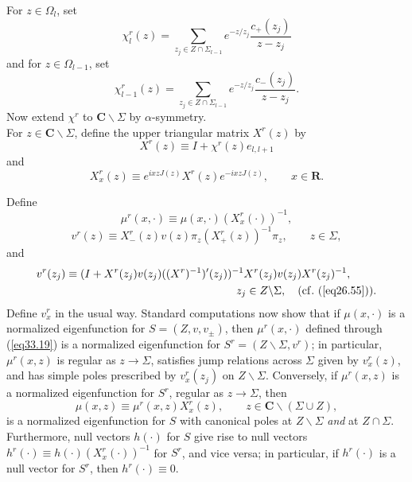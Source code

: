 \documentclass{surv-l}
\theoremstyle{plain}
\theoremstyle{definition}
\numberwithin{equation}{chapter}
\begin{document}
For $z\in\Omega_{l}$, set
\begin{equation*}
\chi_{l}^{r}(z)=\sum_{z_{j}\in Z\cap\Sigma_{l-1}}e^{-z/z_{j}}\frac{c_{+}(z_{j})}{z-z_{j}}
\end{equation*}
and for $z\in\Omega_{l-1}$, set
\begin{equation*}
\chi_{l-1}^{r}(z)=\sum_{z_{j}\in Z\cap\Sigma_{l-1}}e^{-z/z_{j}}\frac{c_{-}(z_{j})}{z-z_{j}}.
\end{equation*}
Now extend $\chi^{r}$ to $ \mathbf{C}\backslash \Sigma$ by $\alpha$-symmetry.\\
For $ z\in \mathbf{C}\backslash \Sigma$, define the upper triangular matrix $X^{r}(z)$ by
\setcounter{equation}{16}
\begin{equation}\label{eq33.17}
X^{r}(z)\equiv I+\chi^{r}(z)e_{l,l+1}
\end{equation}
and
\begin{equation}\label{eq33.18}
X_{x}^{r}(z)\equiv e^{ixzJ(z)}X^{r}(z)e^{-ixzJ(z)},\qquad x\in \mathbf{R}.
\end{equation}

Define
\begin{equation}\label{eq33.19}
\mu^{r}(x, \cdot)\equiv\mu(x, \cdot)(X_{x}^{r}(\cdot))^{-1},
\end{equation}
\begin{equation}\label{eq33.20}
v^{r}(z)\equiv X_{-}^{r}(z)v(z)\pi_{z}(X_{+}^{r}(z))^{-1}\pi_{z},\qquad  z\in\Sigma,
\end{equation}
and
\begin{align}\label{eq33.21}
& v^{r}(z_{j})\equiv(I+X^{r}(z_{j})v(z_{j})((X^{r})^{-1})'(z_{j}))^{-1}X^{r}(z_{j})v(z_{j})X^{r}(z_{j})^{-1},\\ \nonumber
&\qquad\qquad\qquad\qquad\qquad\qquad\qquad\qquad\qquad z_{j}\in Z\backslash \Sigma,\quad (\mathrm{cf}.\ (\ref{eq26.55})).
 \end{align}
Define $v_{x}^{r}$ in the usual way. Standard computations now show that if $\mu(x, \cdot)$ is a normalized eigenfunction for $S=(Z, v, v_{\pm})$, then $\mu^{r}(x, \cdot)$ defined through (\ref{eq33.19}) is a normalized eigenfunction for $S^{r}=(Z\backslash \Sigma, v^{r})$; in particular, $\mu^{r}(x, z)$ is regular as $ z\rightarrow\Sigma$, satisfies jump relations across $\Sigma$ given by $v_{x}^{r}(z)$, and has simple poles prescribed by $v_{x}^{r}(z_{j})$ on $ Z\backslash \Sigma$. Conversely, if $\mu^{r}(x, z)$ is a normalized eigenfunction for $S^{r}$, regular as $ z\rightarrow\Sigma$, then
\begin{equation}\label{eq33.22}
\mu(x,z)\equiv\mu^{r}(x, z)X_{x}^{r}(z),\qquad z\in \mathbf{C}\backslash (\Sigma\cup Z),
\end{equation}
is a normalized eigenfunction for $S$ with canonical poles at $ Z\backslash \Sigma$ \emph{and} at $ Z\cap\Sigma$. Furthermore, null vectors $h(\cdot)$ for $S$ give rise to null vectors $h^{r}(\cdot)\equiv h(\cdot)(X_{x}^{r}(\cdot))^{-1}$ for $S^{r}$, and vice versa; in particular, if $h^{r}(\cdot)$ is a null vector for $S^{r}$, then $h^{r}(\cdot)\equiv 0$.
\end{document}
